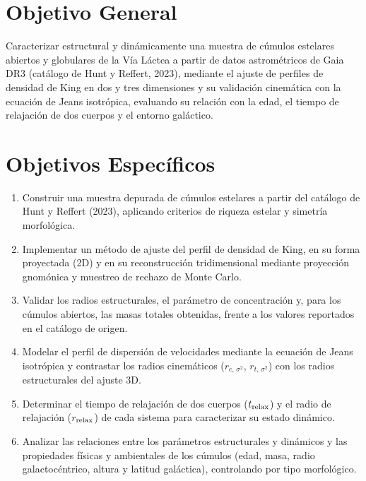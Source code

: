     \section{Objetivo General}

        Caracterizar estructural y dinámicamente una muestra de cúmulos 
        estelares abiertos y globulares de la Vía Láctea a partir de datos 
        astrométricos de Gaia DR3 (catálogo de Hunt y Reffert, 2023), mediante 
        el ajuste de perfiles de densidad de King en dos y tres dimensiones y su 
        validación cinemática con la ecuación de Jeans isotrópica, evaluando su 
        relación con la edad, el tiempo de relajación de dos cuerpos y el 
        entorno galáctico.

    \section{Objetivos Específicos}

        \begin{enumerate}
            \item Construir una muestra depurada de cúmulos estelares a partir 
            del catálogo de Hunt y Reffert (2023), aplicando criterios de 
            riqueza estelar y simetría morfológica.
            \item Implementar un método de ajuste del perfil de densidad de 
            King, en su forma proyectada (2D) y en su reconstrucción 
            tridimensional mediante proyección gnomónica y muestreo de rechazo 
            de Monte Carlo.
            \item Validar los radios estructurales, el parámetro de 
            concentración y, para los cúmulos abiertos, las masas totales 
            obtenidas, frente a los valores reportados en el catálogo de origen.
            \item Modelar el perfil de dispersión de velocidades mediante la 
            ecuación de Jeans isotrópica y contrastar los radios cinemáticos 
            ($r_{c,\, \sigma^2}$, $r_{t,\, \sigma^2}$) con los radios 
            estructurales del ajuste 3D.
            \item Determinar el tiempo de relajación de dos cuerpos 
            ($t_{\rm relax}$) y el radio de relajación ($r_{\rm relax}$) de cada 
            sistema para caracterizar su estado dinámico.
            \item Analizar las relaciones entre los parámetros estructurales y 
            dinámicos y las propiedades físicas y ambientales de los cúmulos 
            (edad, masa, radio galactocéntrico, altura y latitud galáctica), 
            controlando por tipo morfológico.
        \end{enumerate}

